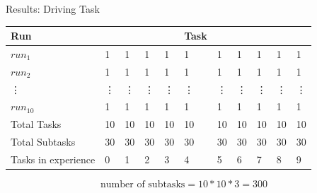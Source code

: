 
\begin{frame}[fragile]{Results: Driving Task} 
\begin{table}[H]
    \centering
    \begin{tabular}%
    {l | p{0.3cm} p{0.3cm} p{0.3cm} p{0.3cm} p{0.3cm} p{0.3cm} p{0.3cm} p{0.3cm}p{0.3cm} p{0.3cm}}
  Run &  &   &  &  & Task &  &  &  &  & \\ \hline
  $\mathit{run}_1$ & 1 & 1  & 1 & 1 & 1 & 1 & 1 & 1 & 1 & 1\\
  $\mathit{run}_2$ & 1 & 1  & 1 & 1 & 1 & 1 & 1 & 1 & 1 & 1\\
  \quad\vdots &\vdots & \vdots  & \vdots & \vdots & \vdots & \vdots & \vdots & \vdots & \vdots & \vdots\\
  $\mathit{run}_{10}$ & 1 & 1  & 1 & 1 & 1 & 1 & 1 & 1 & 1 & 1\\\hline
    Total Tasks& 10 & 10  & 10 & 10 & 10 & 10 & 10 & 10 & 10 & 10\\
    Total Subtasks & 30 & 30  & 30 & 30 & 30 & 30 & 30 & 30 & 30 & 30\\\hline
    Tasks in experience & 0 & 1 & 2 & 3 &4 & 5 &6 & 7& 8  &9\\ 
    \end{tabular}
\end{table}\pause

\[\textrm{number of subtasks} = 10 * 10 * 3 = 300\]
\end{frame}





